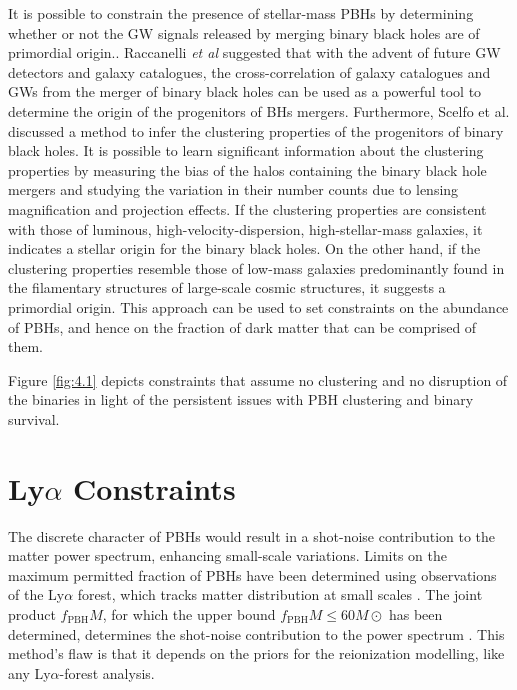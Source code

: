 It is possible to constrain the presence of stellar-mass PBHs by determining whether or not the GW signals released by merging binary black holes are of primordial origin.\cite{Raccanelli:2016cud, Scelfo:2018sny}. Raccanelli \emph{et al}\cite{Raccanelli:2016cud} suggested that with the advent of future GW detectors and galaxy catalogues, the cross-correlation of galaxy catalogues and GWs from the merger of binary black holes can be used as a powerful tool to determine the origin of the progenitors of BHs mergers. Furthermore, Scelfo et al. \cite{Scelfo:2018sny} discussed a method to infer the clustering properties of the progenitors of binary black holes. It is possible to learn significant information about the clustering properties by measuring the bias of the halos containing the binary black hole mergers and studying the variation in their number counts due to lensing magnification and projection effects. If the clustering properties are consistent with those of luminous, high-velocity-dispersion, high-stellar-mass galaxies, it indicates a stellar origin for the binary black holes. On the other hand, if the clustering properties resemble those of low-mass galaxies predominantly found in the filamentary structures of large-scale cosmic structures, it suggests a primordial origin. This approach can be used to set constraints on the abundance of PBHs, and hence on the fraction of dark matter that can be comprised of them.

Figure \ref{fig:4.1} depicts constraints \cite{PhysRevD.98.023536}\cite{LIGOScientific:2019kan} that assume no clustering and no disruption of the binaries in light of the persistent issues with PBH clustering and binary survival.
\section{Ly\texorpdfstring{$\alpha$}{alpha} Constraints}

The discrete character of PBHs would result in a shot-noise contribution to the matter power spectrum, enhancing small-scale variations. Limits on the maximum permitted fraction of PBHs have been determined using observations of the Ly$\alpha$ forest, which tracks matter distribution at small scales \cite{Afshordi_2003}. The joint product $f_{\mathrm{PBH}} M$, for which the upper bound $f_{\mathrm{PBH}} M\leq 60 M\odot$ has been determined, determines the shot-noise contribution to the power spectrum \cite{Murgia:2019duy}.
This method's flaw is that it depends on the priors for the reionization modelling, like any Ly$\alpha$-forest analysis.


